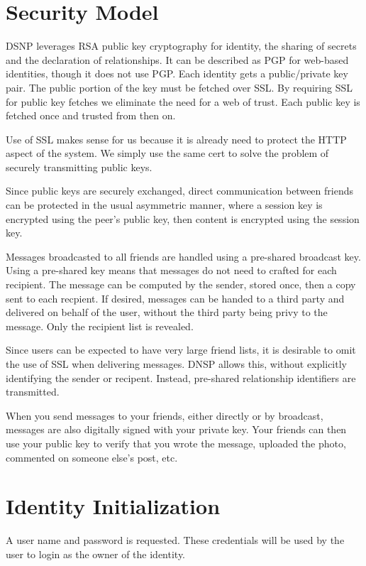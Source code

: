\documentclass[letterpaper,11pt,oneside]{article}
\begin{document}
\section{Security Model}

DSNP leverages RSA public key cryptography for identity, the sharing of secrets
and the declaration of relationships. It can be described as PGP for web-based
identities, though it does not use PGP. Each identity gets a public/private key
pair. The public portion of the key must be fetched over SSL. By requiring SSL
for public key fetches we eliminate the need for a web of trust. Each public
key is fetched once and trusted from then on.

Use of SSL makes sense for us because it is already need to protect the HTTP
aspect of the system. We simply use the same cert to solve the problem of
securely transmitting public keys.

Since public keys are securely exchanged, direct communication between friends
can be protected in the usual asymmetric manner, where a session key is
encrypted using the peer's public key, then content is encrypted using the
session key.

Messages broadcasted to all friends are handled using a pre-shared broadcast
key. Using a pre-shared key means that messages do not need to crafted for each
recipient. The message can be computed by the sender, stored once, then a copy
sent to each recpient. If desired, messages can be handed to a third party and
delivered on behalf of the user, without the third party being privy to the
message. Only the recipient list is revealed.

Since users can be expected to have very large friend lists, it is desirable to
omit the use of SSL when delivering messages. DNSP allows this, without
explicitly identifying the sender or recipent. Instead, pre-shared relationship
identifiers are transmitted.

When you send messages to your friends, either directly or by broadcast,
messages are also digitally signed with your private key. Your friends can then
use your public key to verify that you wrote the message, uploaded the photo,
commented on someone else's post, etc.

\section{Identity Initialization}

A user name and password is requested. These credentials will be used by the
user to login as the owner of the identity.
\end{document}
